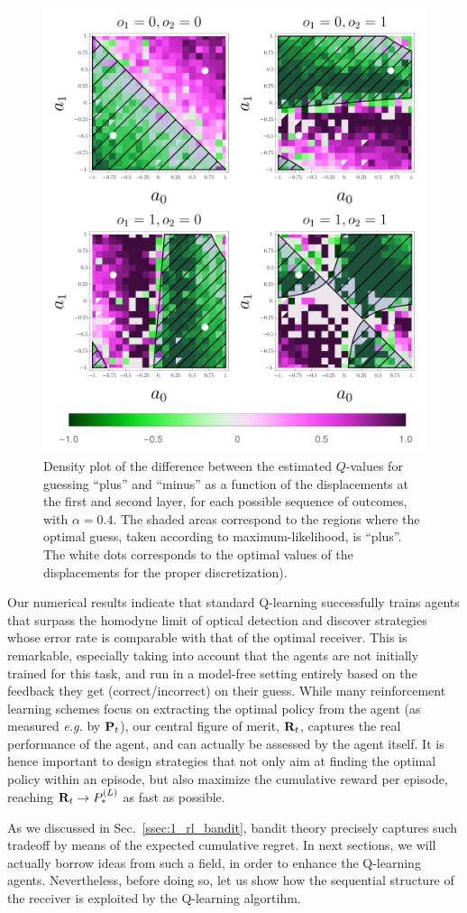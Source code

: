 \begin{figure}
    \centering
       \includegraphics[width=.85\textwidth]{Figures/315/barri.pdf}
    \caption{Density plot of the difference between the estimated $Q$-values for guessing ``plus'' and ``minus'' as a function of the displacements at the first and second layer, for each possible sequence of outcomes, with $\alpha=0.4$. The shaded areas correspond to the regions where the optimal guess, taken according to maximum-likelihood, is ``plus''. The white dots corresponds to the optimal values of the displacements for the proper discretization).
    }
    \label{fig:315guess}
\end{figure}

Our numerical results indicate that standard Q-learning successfully trains agents that surpass the homodyne limit of optical detection and discover strategies whose error rate is comparable with that of the optimal receiver. This is remarkable, especially taking into account that the agents are not initially trained for this task, and run in a model-free setting entirely based on the feedback they get (correct/incorrect) on their guess. While many reinforcement learning schemes focus on extracting the optimal policy from the agent (as measured \textit{e.g.} by $\mathbf{P}_{t}$), our central figure of merit, $\mathbf{R}_{t}$, captures the real performance of the agent, and can actually be assessed by the agent itself. It is hence important to design strategies that not only aim at finding the optimal policy within an episode, but also maximize the cumulative reward per episode, reaching $\mathbf{R}_{t} \rightarrow P_*^{(L)}$ as fast as possible.

As we discussed in Sec.~\ref{ssec:1_rl_bandit}, bandit theory precisely captures such tradeoff by means of the expected cumulative regret. In next sections, we will actually borrow ideas from such a field, in order to enhance the Q-learning agents. Nevertheless, before doing so, let us show how the sequential structure of the receiver is exploited by the Q-learning algortihm.
%
